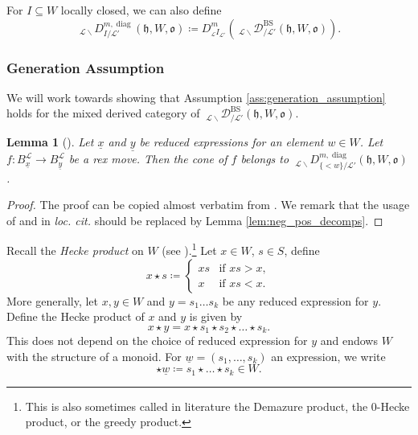 \documentclass{amsart}
\newcommand{\scrL}{\mathcal{L}}
\newcommand{\fr}[1]{\mathfrak{#1}}
\DeclareMathOperator{\diag}{diag}
\DeclareMathOperator{\BS}{BS}
\newcommand{\EWmon}[2]{\:_{#1 \backslash} \mathcal{D}_{/ #2} }
\newcommand{\DDBEI}[3]{\:_{#2 \backslash} D_{#1 / #3}^{m, \diag} }
\newcommand{\uw}{\underline{w}}
\newcommand{\ux}{\underline{x}}
\newcommand{\uy}{\underline{y}}
\newtheorem{lemma}[subsubsection]{Lemma}
\theoremstyle{definition}
\numberwithin{equation}{subsection}
\begin{document}
For $I \subseteq W$ locally closed, we can also define
\[\DDBEI{I}{\scrL}{\scrL'} (\fr{h}, W, \fr{o})\coloneq D^m_{{}_{\scrL} I_{\scrL'}} \left( \EWmon{\scrL}{\scrL'}^{\BS} (\fr{h}, W, \fr{o}) \right).\]

\subsubsection{Generation Assumption}

We will work towards showing that Assumption \ref{ass:generation_assumption} holds for the mixed derived category of $\EWmon{\scrL}{\scrL'}^{\BS} (\fr{h}, W, \fr{o})$.

\begin{lemma}[{\cite[Lemma 6.1]{ARV}}]\label{lem:cone_of_rex}
    Let $\ux$ and $\uy$ be reduced expressions for an element $w \in W$.
    Let $f : B_{\ux}^{\scrL} \to B_{\uy}^{\scrL}$ be a rex move.
    Then the cone of $f$ belongs to $\DDBEI{\{ < w\} }{\scrL}{\scrL'} (\fr{h}, W, \fr{o})$.
\end{lemma}
\begin{proof}
    The proof can be copied almost verbatim from \cite{ARV}. We remark that the usage of \cite[Lemma 7.4]{EW} and \cite[Lemma 7.5]{EW} in \emph{loc. cit.} should be replaced by Lemma \ref{lem:neg_pos_decomps}.
\end{proof}

Recall the \emph{Hecke product} on $W$ (see \cite{BM}).\footnote{This is also sometimes called in literature the Demazure product, the 0-Hecke product, or the greedy product.}
Let $x \in W$, $s \in S$, define
\[x \star s \coloneq \begin{cases}
    x s & \text{if } xs > x, \\
    x & \text{if } xs < x. 
\end{cases}\]
More generally, let $x,y \in W$ and $y = s_1 \ldots s_k$ be any reduced expression for $y$.
Define the Hecke product of $x$ and $y$ is given by
\[x \star y = x \star s_1 \star s_2 \star \ldots \star s_k.\]
This does not depend on the choice of reduced expression for $y$ and endows $W$ with the structure of a monoid.
For $\uw = (s_1, \ldots, s_k)$ an expression, we write
\[\star \uw \coloneq s_1 \star \ldots \star s_k \in W.\]
\end{document}
